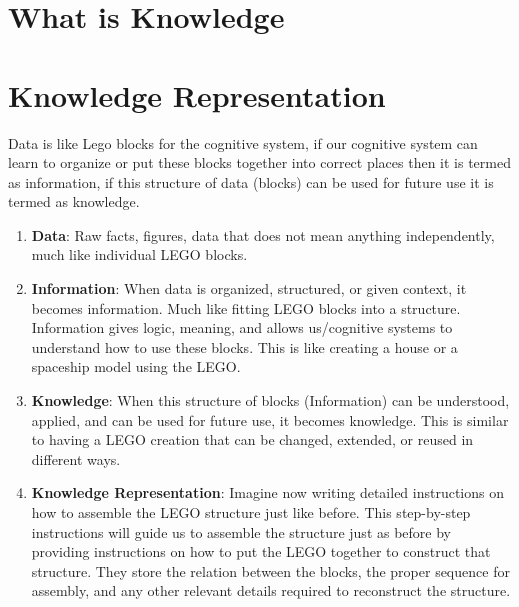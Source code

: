\documentclass[12pt]{report}
\begin{document}



\tableofcontents


%

\newpage
\listoffigures
\newpage

\chapter{What is Knowledge}


\chapter{Knowledge Representation}

Data is like Lego blocks for the cognitive system, if our cognitive system can
learn to organize or put these blocks together into correct places then it is
termed as information, if this structure of data (blocks) can be used for
future use it is termed as knowledge.

\begin{enumerate}
  \item \textbf{Data}: Raw facts, figures, data that does not mean anything
    independently, much like individual LEGO blocks.

  \item \textbf{Information}: When data is organized, structured, or given
    context, it becomes information. Much like fitting LEGO blocks into a
    structure. Information gives logic, meaning, and allows us/cognitive
    systems to understand how to use these blocks. This is like creating a
    house or a spaceship model using the LEGO.

  \item \textbf{Knowledge}: When this structure of blocks (Information) can be
    understood, applied, and can be used for future use, it becomes knowledge.
    This is similar to having a LEGO creation that can be changed, extended, or
    reused in different ways.

  \item \textbf{Knowledge Representation}: Imagine now writing detailed
    instructions on how to assemble the LEGO structure just like before. This
    step-by-step instructions will guide us to assemble the structure just as
    before by providing instructions on how to put the LEGO together to
    construct that structure. They store the relation between the blocks, the
    proper sequence for assembly, and any other relevant details required to
    reconstruct the structure.
\end{enumerate}
\end{document}
